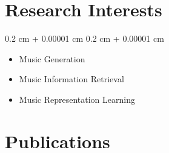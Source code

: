 \documentclass[11pt, letterpaper]{article}
\newenvironment{highlightsforbulletentries}{
    \begin{itemize}[
        topsep=0.10 cm,
        parsep=0.10 cm,
        partopsep=0pt,
        itemsep=0pt,
        leftmargin=10pt
    ]
}{
    \end{itemize}
} %
\newenvironment{onecolentry}{
    \begin{adjustwidth}{
        0.2 cm + 0.00001 cm
    }{
        0.2 cm + 0.00001 cm
    }
}{
    \end{adjustwidth}
} %
\begin{document}
    \section{Research Interests}
    \begin{onecolentry}
        \begin{highlightsforbulletentries}
            \item Music Generation

            \item Music Information Retrieval

            \item Music Representation Learning
        \end{highlightsforbulletentries}
    \end{onecolentry}


    \section{Publications}
\end{document}
